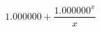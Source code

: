 \documentclass{article}
\title{}
\author{}
\begin{document}
\maketitle
$$1.000000+\frac{1.000000^{x}}{x}$$
\end{document}
